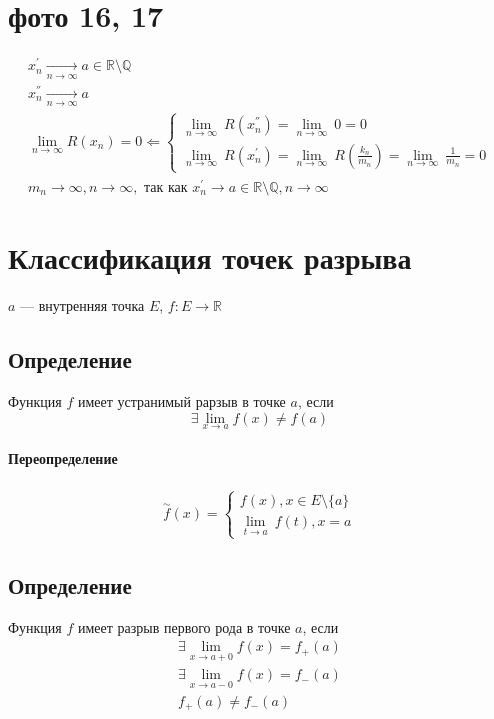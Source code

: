 \documentclass{article}
\begin{document}
\section{фото 16, 17}

\begin{gather*}
    x_n^{'}  \underset{n \to \infty}{\longrightarrow} a \in \mathbb{R} \setminus \mathbb{Q} \\
    x_n^{''} \underset{n \to \infty}{\longrightarrow} a \\
    \lim_{n \to \infty} R(x_n) = 0 \Leftarrow
    \begin{cases}
        \underset{n \to \infty}{\lim} ~ R(x_n^{''}) = \underset{n \to \infty}{\lim} ~ 0 = 0 \\
        \underset{n \to \infty}{\lim} ~ R(x_n^{'})  = \underset{n \to \infty}{\lim} ~ R \left( \frac{k_n}{m_n} \right) =
        \underset{n \to \infty}{\lim} ~ \frac{1}{m_n} = 0
    \end{cases} \\
    m_n \to \infty, n \to \infty, \text{ так как } x_n^{'} \to a \in \mathbb{R} \setminus \mathbb{Q}, n \to \infty
\end{gather*}



\section{Классификация точек разрыва}

$a$ --- внутренняя точка $E$, $f: E \rightarrow \mathbb{R}$

\subsection{Определение}
Функция $f$ имеет устранимый рарзыв в точке $a$, если
\[
    \exists \lim_{x \to a} f(x) \neq f(a)
\]

\paragraph{Переопределение}
\begin{gather*}
    \overset{\sim}{f} (x) =
    \begin{cases}
        f(x), x \in E \setminus \{a\} \\
        \underset{t \to a}{\lim} ~ f(t), x = a
    \end{cases}
\end{gather*}


\subsection{Определение}
Функция $f$ имеет разрыв первого рода в точке $a$, если
\begin{gather*}
    \exists \lim_{x \to a + 0} f(x) = f_+(a) \\
    \exists \lim_{x \to a - 0} f(x) = f_-(a) \\
    f_+(a) \neq f_-(a)
\end{gather*}
\end{document}
